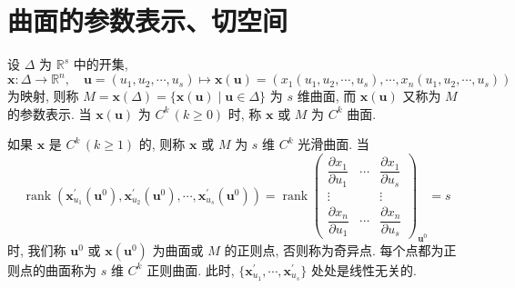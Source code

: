 
\section{曲面的参数表示、切空间}\label{sec:9.1}

\begin{definition}\label{def:9.1.1}
设 $\Delta$ 为 $\mathbb{R}^{s}$ 中的开集,
\[
  \boldsymbol{x}\colon \Delta \to \mathbb{R}^{n}, \quad \boldsymbol{u} = (u_{1}, u_{2}, \cdots, u_{s}) \mapsto \boldsymbol{x}(\boldsymbol{u}) = (x_{1}(u_{1}, u_{2}, \cdots, u_{s}), \cdots, x_{n}(u_{1}, u_{2}, \cdots, u_{s}))
\]
为映射, 则称 $M = \boldsymbol{x}(\Delta) = \{\boldsymbol{x}(\boldsymbol{u}) \mid \boldsymbol{u} \in \Delta\}$ 为 $s$ 维曲面, 而 $\boldsymbol{x}(\boldsymbol{u})$ 又称为 $M$ 的参数表示. 当 $\boldsymbol{x}(\boldsymbol{u})$ 为 $C^{k}\,(k \geqslant 0)$ 时, 称 $\boldsymbol{x}$ 或 $M$ 为 $C^{k}$ 曲面.
\end{definition}

如果 $\boldsymbol{x}$ 是 $C^{k}\,(k \geqslant 1)$ 的, 则称 $\boldsymbol{x}$ 或 $M$ 为 $s$ 维 $C^{k}$ 光滑曲面. 当
\[
  \operatorname{rank}(\boldsymbol{x}_{u_{1}}^{\prime}(\boldsymbol{u}^{0}), \boldsymbol{x}_{u_{2}}^{\prime}(\boldsymbol{u}^{0}), \cdots, \boldsymbol{x}_{u_{s}}^{\prime}(\boldsymbol{u}^{0}))
  = \operatorname{rank}\begin{pmatrix}
    \dfrac{\partial x_{1}}{\partial u_{1}} & \cdots & \dfrac{\partial x_{1}}{\partial u_{s}} \\
    \vdots & & \vdots \\
    \dfrac{\partial x_{n}}{\partial u_{1}} & \cdots & \dfrac{\partial x_{n}}{\partial u_{s}}
  \end{pmatrix}_{\boldsymbol{u}^{0}} = s
\]
时, 我们称 $\boldsymbol{u}^{0}$ 或 $\boldsymbol{x}(\boldsymbol{u}^{0})$ 为曲面或 $M$ 的正则点, 否则称为奇异点. 每个点都为正则点的曲面称为 $s$ 维 $C^{k}$ 正则曲面. 此时, $\{\boldsymbol{x}_{u_{1}}^{\prime}, \cdots, \boldsymbol{x}_{u_{s}}^{\prime}\}$ 处处是线性无关的.

